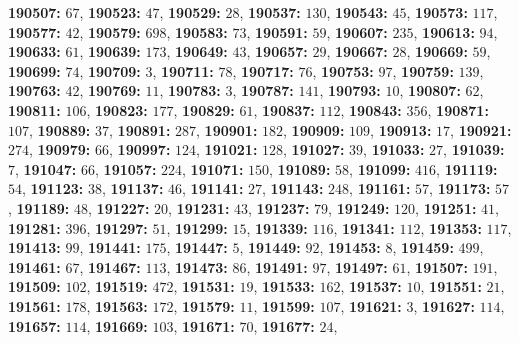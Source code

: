 \textsf{\bfseries 190507:} $67$, \textsf{\bfseries 190523:} $47$, \textsf{\bfseries 190529:} $28$, \textsf{\bfseries 190537:} $130$, \textsf{\bfseries 190543:} $45$, \textsf{\bfseries 190573:} $117$, \textsf{\bfseries 190577:} $42$, \textsf{\bfseries 190579:} $698$, \textsf{\bfseries 190583:} $73$, \textsf{\bfseries 190591:} $59$, \textsf{\bfseries 190607:} $235$, \textsf{\bfseries 190613:} $94$, \textsf{\bfseries 190633:} $61$, \textsf{\bfseries 190639:} $173$, \textsf{\bfseries 190649:} $43$, \textsf{\bfseries 190657:} $29$, \textsf{\bfseries 190667:} $28$, \textsf{\bfseries 190669:} $59$, \textsf{\bfseries 190699:} $74$, \textsf{\bfseries 190709:} $3$, \textsf{\bfseries 190711:} $78$, \textsf{\bfseries 190717:} $76$, \textsf{\bfseries 190753:} $97$, \textsf{\bfseries 190759:} $139$, \textsf{\bfseries 190763:} $42$, \textsf{\bfseries 190769:} $11$, \textsf{\bfseries 190783:} $3$, \textsf{\bfseries 190787:} $141$, \textsf{\bfseries 190793:} $10$, \textsf{\bfseries 190807:} $62$, \textsf{\bfseries 190811:} $106$, \textsf{\bfseries 190823:} $177$, \textsf{\bfseries 190829:} $61$, \textsf{\bfseries 190837:} $112$, \textsf{\bfseries 190843:} $356$, \textsf{\bfseries 190871:} $107$, \textsf{\bfseries 190889:} $37$, \textsf{\bfseries 190891:} $287$, \textsf{\bfseries 190901:} $182$, \textsf{\bfseries 190909:} $109$, \textsf{\bfseries 190913:} $17$, \textsf{\bfseries 190921:} $274$, \textsf{\bfseries 190979:} $66$, \textsf{\bfseries 190997:} $124$, \textsf{\bfseries 191021:} $128$, \textsf{\bfseries 191027:} $39$, \textsf{\bfseries 191033:} $27$, \textsf{\bfseries 191039:} $7$, \textsf{\bfseries 191047:} $66$, \textsf{\bfseries 191057:} $224$, \textsf{\bfseries 191071:} $150$, \textsf{\bfseries 191089:} $58$, \textsf{\bfseries 191099:} $416$, \textsf{\bfseries 191119:} $54$, \textsf{\bfseries 191123:} $38$, \textsf{\bfseries 191137:} $46$, \textsf{\bfseries 191141:} $27$, \textsf{\bfseries 191143:} $248$, \textsf{\bfseries 191161:} $57$, \textsf{\bfseries 191173:} $57$, \textsf{\bfseries 191189:} $48$, \textsf{\bfseries 191227:} $20$, \textsf{\bfseries 191231:} $43$, \textsf{\bfseries 191237:} $79$, \textsf{\bfseries 191249:} $120$, \textsf{\bfseries 191251:} $41$, \textsf{\bfseries 191281:} $396$, \textsf{\bfseries 191297:} $51$, \textsf{\bfseries 191299:} $15$, \textsf{\bfseries 191339:} $116$, \textsf{\bfseries 191341:} $112$, \textsf{\bfseries 191353:} $117$, \textsf{\bfseries 191413:} $99$, \textsf{\bfseries 191441:} $175$, \textsf{\bfseries 191447:} $5$, \textsf{\bfseries 191449:} $92$, \textsf{\bfseries 191453:} $8$, \textsf{\bfseries 191459:} $499$, \textsf{\bfseries 191461:} $67$, \textsf{\bfseries 191467:} $113$, \textsf{\bfseries 191473:} $86$, \textsf{\bfseries 191491:} $97$, \textsf{\bfseries 191497:} $61$, \textsf{\bfseries 191507:} $191$, \textsf{\bfseries 191509:} $102$, \textsf{\bfseries 191519:} $472$, \textsf{\bfseries 191531:} $19$, \textsf{\bfseries 191533:} $162$, \textsf{\bfseries 191537:} $10$, \textsf{\bfseries 191551:} $21$, \textsf{\bfseries 191561:} $178$, \textsf{\bfseries 191563:} $172$, \textsf{\bfseries 191579:} $11$, \textsf{\bfseries 191599:} $107$, \textsf{\bfseries 191621:} $3$, \textsf{\bfseries 191627:} $114$, \textsf{\bfseries 191657:} $114$, \textsf{\bfseries 191669:} $103$, \textsf{\bfseries 191671:} $70$, \textsf{\bfseries 191677:} $24$, 
